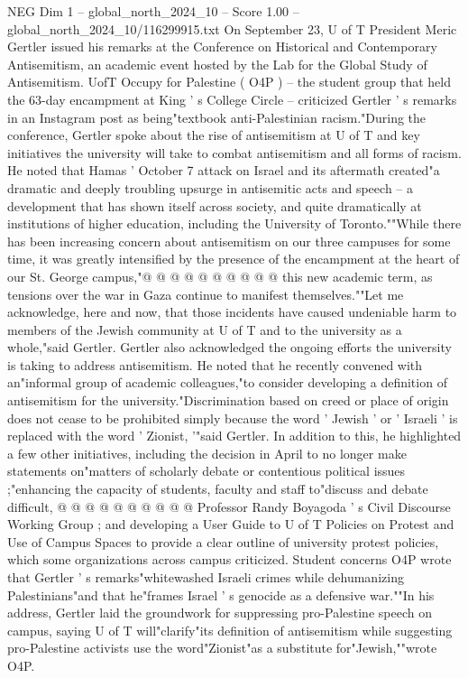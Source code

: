 \begin{textsample}{NEG Dim 1 – global\_north\_2024\_10 – Score 1.00 – global\_north\_2024\_10/116299915.txt}  \label{ex:f1_neg_376}
On September 23, U of T President Meric Gertler issued his remarks at the Conference on Historical and Contemporary Antisemitism, an academic event hosted by the Lab for the Global Study of Antisemitism.
UofT Occupy for Palestine ( O4P ) -- the student group that held the 63-day encampment at King ' s College Circle -- criticized Gertler ' s remarks in an Instagram post as being"textbook anti-Palestinian racism."During the conference, Gertler spoke about the rise of antisemitism at U of T and key initiatives the university will take to combat antisemitism and all forms of racism.
He noted that Hamas ' October 7 attack on Israel and its aftermath created"a dramatic and deeply troubling upsurge in antisemitic acts and speech -- a development that has shown itself across society, and quite dramatically at institutions of higher education, including the University of Toronto.""While there has been increasing concern about antisemitism on our three campuses for some time, it was greatly intensified by the presence of the encampment at the heart of our St.
George campus,"@ @ @ @ @ @ @ @ @ @ this new academic term, as tensions over the war in Gaza continue to manifest themselves.""Let me acknowledge, here and now, that those incidents have caused undeniable harm to members of the Jewish community at U of T and to the university as a whole,"said Gertler.
Gertler also acknowledged the ongoing efforts the university is taking to address antisemitism.
He noted that he recently convened with an"informal group of academic colleagues,"to consider developing a definition of antisemitism for the university."Discrimination based on creed or place of origin does not cease to be prohibited simply because the word ' Jewish ' or ' Israeli ' is replaced with the word ' Zionist, '"said Gertler.
In addition to this, he highlighted a few other initiatives, including the decision in April to no longer make statements on"matters of scholarly debate or contentious political issues ;"enhancing the capacity of students, faculty and staff to"discuss and debate difficult, @ @ @ @ @ @ @ @ @ @ Professor Randy Boyagoda ' s Civil Discourse Working Group ; and developing a User Guide to U of T Policies on Protest and Use of Campus Spaces to provide a clear outline of university protest policies, which some organizations across campus criticized.
Student concerns O4P wrote that Gertler ' s remarks"whitewashed Israeli crimes while dehumanizing Palestinians"and that he"frames Israel ' s genocide as a defensive war.""In his address, Gertler laid the groundwork for suppressing pro-Palestine speech on campus, saying U of T will"clarify"its definition of antisemitism while suggesting pro-Palestine activists use the word"Zionist"as a substitute for"Jewish,""wrote O4P.

\end{textsample}
